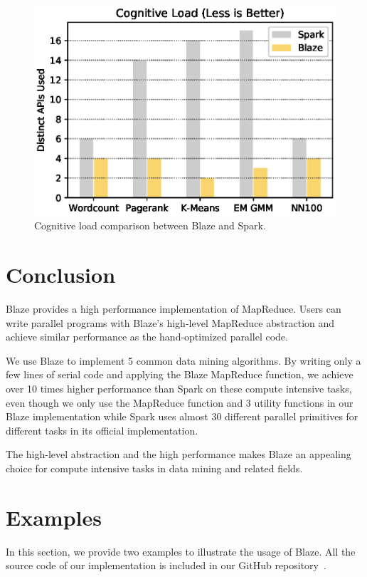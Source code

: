 \begin{figure}
  \begin{center}
  \includegraphics[width=0.7\linewidth]{figs/cognitive.eps}
  \end{center}
  \vspace{-0.5cm}
  \caption{Cognitive load comparison between Blaze and Spark.}
  \label{fig:cog}
\end{figure}

\section{Conclusion}
\label{sec:con}
Blaze provides a high performance implementation of MapReduce.
Users can write parallel programs with Blaze's high-level MapReduce abstraction and achieve similar performance as the hand-optimized parallel code.

We use Blaze to implement 5 common data mining algorithms.
By writing only a few lines of serial code and applying the Blaze MapReduce function, we achieve over 10 times higher performance than Spark on these compute intensive tasks, even though we only use the MapReduce function and 3 utility functions in our Blaze implementation while Spark uses almost 30 different parallel primitives for different tasks in its official implementation.

The high-level abstraction and the high performance makes Blaze an appealing choice for compute intensive tasks in data mining and related fields.

\section{Examples}
In this section, we provide two examples to illustrate the usage of Blaze.
All the source code of our implementation is included in our GitHub repository~\cite{blaze}.

